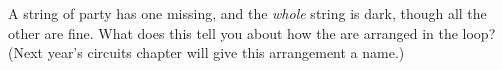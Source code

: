 \begin{exercise}[$\star\star$]\label{exo:g3:first-electric-circuit:11}
A string of party  has one  missing, and the \emph{whole}
string is dark, though all the other  are fine. What does this
tell you about how the  are arranged in the loop? (Next year's
circuits chapter will give this arrangement a name.)
\end{exercise}
